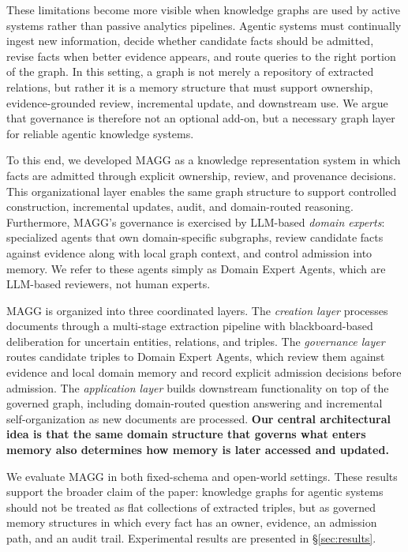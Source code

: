 \documentclass{article}
\newcommand{\system}{\textsc{MAGG}}
\begin{document}
These limitations become more visible when knowledge graphs are used by active systems rather than passive analytics pipelines. Agentic systems must continually ingest new information, decide whether candidate facts should be admitted, revise facts when better evidence appears, and route queries to the right portion of the graph. In this setting, a graph is not merely a repository of extracted relations, but rather it is a memory structure that must support ownership, evidence-grounded review, incremental update, and downstream use. We argue that governance is therefore not an optional add-on, but a necessary graph layer for reliable agentic knowledge systems.

To this end, we developed \system{} as a knowledge representation system in which facts are admitted through explicit ownership, review, and provenance decisions. This organizational layer enables the same graph structure to support controlled construction, incremental updates, audit, and domain-routed reasoning. Furthermore, \system{}'s governance is exercised by LLM-based \textit{domain experts}: specialized agents that own domain-specific subgraphs, review candidate facts against evidence along with local graph context, and control admission into memory. We refer to these agents simply as Domain Expert Agents, which are LLM-based reviewers, not human experts.

\system{} is organized into three coordinated layers. The \emph{creation layer} processes documents through a multi-stage extraction pipeline with blackboard-based deliberation for uncertain entities, relations, and triples. The \emph{governance layer} routes candidate triples to Domain Expert Agents, which review them against evidence and local domain memory and record explicit admission decisions before admission. The \emph{application layer} builds downstream functionality on top of the governed graph, including domain-routed question answering and incremental self-organization as new documents are processed. \textbf{Our central architectural idea is that the same domain structure that governs what enters memory also determines how memory is later accessed and updated.}

We evaluate \system{} in both fixed-schema and open-world settings. These results support the broader claim of the paper: knowledge graphs for agentic systems should not be treated as flat collections of extracted triples, but as governed memory structures in which every fact has an owner, evidence, an admission path, and an audit trail. Experimental results are presented in \S\ref{sec:results}.
\end{document}
